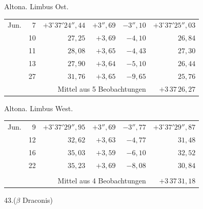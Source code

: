 \noindent\begin{minipage}[t]{.495\textwidth}\centering Altona. Limbus Ost.\par\smallskip
{\scriptsize\setlength{\tabcolsep}{1pt}\renewcommand{\arraystretch}{1.2}\begin{tabular}{lr|r|r|r|r|}
Jun.&7&$+3^\circ37'24''{,}44$&$+3''{,}69$&$-3''{,}10$&$+3^\circ37'25''{,}03$\\
&10&$27{,}25$&$+3{,}69$&$-4{,}10$&$26{,}84$\\
&11&$28{,}08$&$+3{,}65$&$-4{,}43$&$27{,}30$\\
&13&$27{,}90$&$+3{,}64$&$-5{,}10$&$26{,}44$\\
&27&$31{,}76$&$+3{,}65$&$-9{,}65$&$25{,}76$\\
\cline{6-6}\multicolumn{5}{r}{Mittel aus 5 Beobachtungen}&$+3\,37\,26{,}27$
\end{tabular}}\end{minipage}\hfill\begin{minipage}[t]{.495\textwidth}\centering Altona. Limbus West.\par\smallskip
{\scriptsize\setlength{\tabcolsep}{1pt}\renewcommand{\arraystretch}{1.2}\begin{tabular}{lr|r|r|r|r}
Jun.&9&$+3^\circ37'29''{,}95$&$+3''{,}69$&$-3''{,}77$&$+3^\circ37'29''{,}87$\\
&12&$32{,}62$&$+3{,}63$&$-4{,}77$&$31{,}48$\\
&16&$35{,}03$&$+3{,}59$&$-6{,}10$&$32{,}52$\\
&22&$35{,}23$&$+3{,}69$&$-8{,}08$&$30{,}84$\\
&&&&&\\
\cline{6-6}\multicolumn{5}{r}{Mittel aus 4 Beobachtungen}&$+3\,37\,31{,}18$
\end{tabular}}\end{minipage}
\par\vspace{4mm}
\begin{center}43.\quad ($\beta$ Draconis)\end{center}

